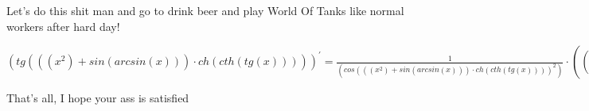 \documentclass{article}
\begin{document}
Let's do this shit man and go to drink beer and play World Of Tanks like normal workers after hard day!

$( tg( ((x ^{ 2}) +  sin(  arcsin( x))) \cdot  ch(  cth(  tg( x)))))^\prime =  \frac{ 1}{( cos( ((x ^{ 2}) +  sin(  arcsin( x))) \cdot  ch(  cth(  tg( x)))) ^{ 2})} \cdot ((x \cdot 2 +  cos(  arcsin( x)) \cdot  \frac{ 1}{\sqrt{(1 - (x ^{ 2}))}}) \cdot  ch(  cth(  tg( x))) + ((x ^{ 2}) +  sin(  arcsin( x))) \cdot  sh(  cth(  tg( x))) \cdot  \frac{ (-1)
}{( sh(  tg( x)) ^{ 2})} \cdot  \frac{ 1}{( cos( x) ^{ 2})})$

	That's all, I hope your ass is satisfied
\end{document}
